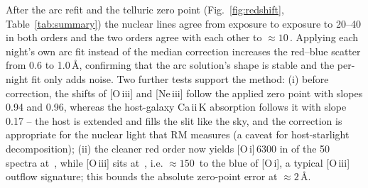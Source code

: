 After the arc refit and the telluric zero point (Fig.~\ref{fig:redshift}, Table~\ref{tab:summary}) the nuclear lines
agree from exposure to exposure to 20--40\,\kms{} in both orders and the two orders agree with each other to
$\approx10$\,\kms. Applying each night's own arc fit instead of the median correction increases the red--blue scatter
from 0.6 to 1.0\,\AA, confirming that the arc solution's shape is stable and the per-night fit only adds noise. Two
further tests support the method: (i) before correction, the shifts of [O\,{\sc iii}] and [Ne\,{\sc iii}] follow the
applied zero point with slopes 0.94 and 0.96, whereas the host-galaxy Ca\,{\sc ii}\,K absorption follows it with slope
0.17 -- the host is extended and fills the slit like the sky, and the correction is appropriate for the nuclear light
that RM measures (a caveat for host-starlight decomposition); (ii) the cleaner red order now yields [O\,{\sc i}]\,6300 in
\OIN{} of the 50 spectra at \OIvel\,\kms, while [O\,{\sc iii}] sits at \OIIIvel\,\kms, i.e. $\approx150$\,\kms{} to the
blue of [O\,{\sc i}], a typical [O\,{\sc iii}] outflow signature; this bounds the absolute zero-point error at
$\approx2$\,\AA.

